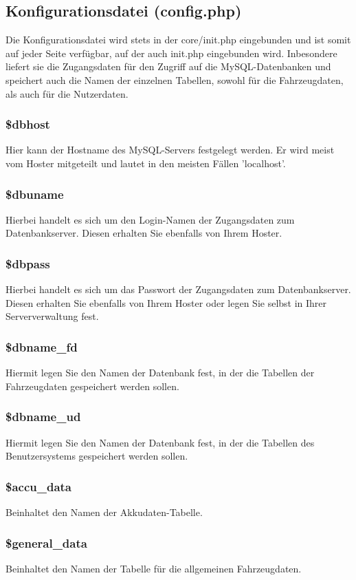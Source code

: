 \documentclass[fontsize = 12pt, paper = a4]{scrreprt}
\begin{document}
\newpage
\subsection{Konfigurationsdatei (config.php)}
Die Konfigurationsdatei wird stets in der core/init.php eingebunden und ist somit auf jeder Seite verfügbar, auf der auch init.php eingebunden wird. Inbesondere liefert sie die Zugangsdaten für den Zugriff auf die MySQL-Datenbanken und speichert auch die Namen der einzelnen Tabellen, sowohl für die Fahrzeugdaten, als auch für die Nutzerdaten.
\subsubsection*{\$dbhost}
Hier kann der Hostname des MySQL-Servers festgelegt werden. Er wird meist vom Hoster mitgeteilt und lautet in den meisten Fällen 'localhost'.
\subsubsection*{\$dbuname}
Hierbei handelt es sich um den Login-Namen der Zugangsdaten zum Datenbankserver. Diesen erhalten Sie ebenfalls von Ihrem Hoster.
\subsubsection*{\$dbpass}
Hierbei handelt es sich um das Passwort der Zugangsdaten zum Datenbankserver. Diesen erhalten Sie ebenfalls von Ihrem Hoster oder legen Sie selbst in Ihrer Serververwaltung fest.
\subsubsection*{\$dbname\_fd}
Hiermit legen Sie den Namen der Datenbank fest, in der die Tabellen der Fahrzeugdaten gespeichert werden sollen.
\subsubsection*{\$dbname\_ud}
Hiermit legen Sie den Namen der Datenbank fest, in der die Tabellen des Benutzersystems gespeichert werden sollen.
\subsubsection*{\$accu\_data}
Beinhaltet den Namen der Akkudaten-Tabelle.
\subsubsection*{\$general\_data}
Beinhaltet den Namen der Tabelle für die allgemeinen Fahrzeugdaten.
\end{document}
